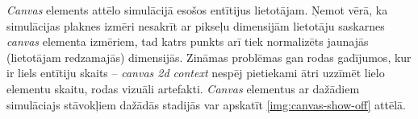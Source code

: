 
\emph{Canvas} elements attēlo simulācijā esošos entītijus lietotājam. Ņemot vērā, ka
simulācijas plaknes izmēri nesakrīt ar pikseļu dimensijām lietotāju saskarnes
\emph{canvas} elementa izmēriem, tad katrs punkts arī tiek normalizēts jaunajās
(lietotājam redzamajās) dimensijās. Zināmas problēmas gan rodas gadījumos, kur
ir liels entītiju skaits -- \emph{canvas 2d context} nespēj pietiekami ātri
uzzīmēt lielo elementu skaitu, rodas vizuāli artefakti. \emph{Canvas} elementus
ar dažādiem simulāciajs stāvokļiem dažādās stadijās var apskatīt \ref{img:canvas-show-off} attēlā.

\begin{figure}[H]%
    \centering
    \qquad
    \qquad

\end{figure}
